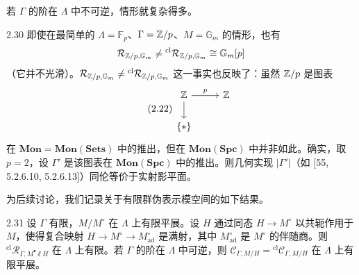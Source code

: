 若 $\Gamma$ 的阶在 $\Lambda$ 中不可逆，情形就复杂得多。

\begin{exam}{2.30}
即使在最简单的 $\Lambda = \mathbb F_p$、$\Gamma = \mathbb{Z}/p$、$M = \mathbb G_m$ 的情形，也有
\[
\mathcal R_{\mathbb{Z}/p,\mathbb G_m} \neq {}^{\mathrm{cl}}\mathcal R_{\mathbb{Z}/p,\mathbb G_m} \cong \mathbb G_m[p]
\]
（它并不光滑）。$\mathcal R_{\mathbb{Z}/p,\mathbb G_m} \neq {}^{\mathrm{cl}}\mathcal R_{\mathbb{Z}/p,\mathbb G_m}$ 这一事实也反映了：虽然 $\mathbb{Z}/p$ 是图表
\begin{equation}
\tag{2.22}
\begin{tikzcd}
\Z \arrow[r, "p"] \arrow[d] & \Z \\
\{*\} &
\end{tikzcd}
\end{equation}
在 $\mathbf{Mon} = \mathbf{Mon}(\mathbf{Sets})$ 中的推出，但在 $\mathbf{Mon}(\mathbf{Spc})$ 中并非如此。确实，取 $p = 2$，设 $\Gamma'$ 是该图表在 $\mathbf{Mon}(\mathbf{Spc})$ 中的推出。则几何实现 $|\Gamma'|$（如 [55, 5.2.6.10, 5.2.6.13]）同伦等价于实射影平面。
\label{exam:zhu2-2-30}
\end{exam}

为后续讨论，我们记录关于有限群伪表示模空间的如下结果。

\begin{prop}{2.31}
设 $\Gamma$ 有限，$M/M^\circ$ 在 $\Lambda$ 上有限平展。设 $H$ 通过同态 $H \to M^\circ$ 以共轭作用于 $M$，使得复合映射 $H \to M^\circ \to M^\circ_{\mathrm{ad}}$ 是满射，其中 $M^\circ_{\mathrm{ad}}$ 是 $M^\circ$ 的伴随商。则 ${}^{\mathrm{cl}}\mathcal R_{\Gamma,M^\bullet\sslash H}$ 在 $\Lambda$ 上有限。若 $\Gamma$ 的阶在 $\Lambda$ 中可逆，则 $\mathcal C_{\Gamma,M/H} = {}^{\mathrm{cl}}\mathcal C_{\Gamma,M/H}$ 在 $\Lambda$ 上有限平展。
\label{prop:zhu2-2-31}
\end{prop}

